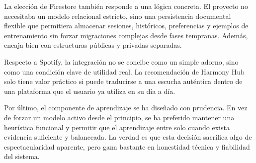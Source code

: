 La elección de Firestore también responde a una lógica concreta. El proyecto no
necesitaba un modelo relacional estricto, sino una persistencia documental
flexible que permitiera almacenar sesiones, históricos, preferencias y ejemplos
de entrenamiento sin forzar migraciones complejas desde fases tempranas. Además,
encaja bien con estructuras públicas y privadas separadas.

Respecto a Spotify, la integración no se concibe como un simple adorno, sino
como una condición clave de utilidad real. La recomendación de Harmony Hub solo
tiene valor práctico si puede traducirse a una escucha auténtica dentro de una
plataforma que el usuario ya utiliza en su día a día.

Por último, el componente de aprendizaje se ha diseñado con prudencia. En vez
de forzar un modelo activo desde el principio, se ha preferido mantener una
heurística funcional y permitir que el aprendizaje entre solo cuando exista
evidencia suficiente y balanceada. La verdad es que esta decisión sacrifica
algo de espectacularidad aparente, pero gana bastante en honestidad técnica y
fiabilidad del sistema.
